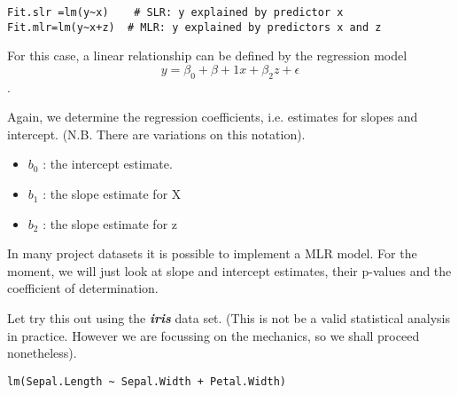 \begin{framed}
\begin{verbatim}
Fit.slr =lm(y~x)  	# SLR: y explained by predictor x
Fit.mlr=lm(y~x+z)  # MLR: y explained by predictors x and z
\end{verbatim}
\end{framed}

For this case, a  linear relationship can be defined by the regression model  \[y =\beta_0 + \beta+1x + \beta_2z + \epsilon\].

Again, we determine the regression coefficients, i.e. estimates for slopes and intercept. (N.B. There are variations on this notation).

\begin{itemize}
\item	$b_0$ : the intercept estimate.
\item	$b_1$  : the slope estimate for X
\item	$b_2$  : the slope estimate for z
\end{itemize}

In many project datasets it is possible to implement a MLR model. For the moment, we will just look at slope and intercept estimates, their p-values and the coefficient of determination.

Let try this out using the \textbf{\textit{iris}} data set. (This is not be a valid statistical analysis in practice. However we are focussing on the mechanics, so we shall proceed nonetheless).
\begin{framed}
\begin{verbatim}
lm(Sepal.Length ~ Sepal.Width + Petal.Width)
\end{verbatim}
\end{framed}







